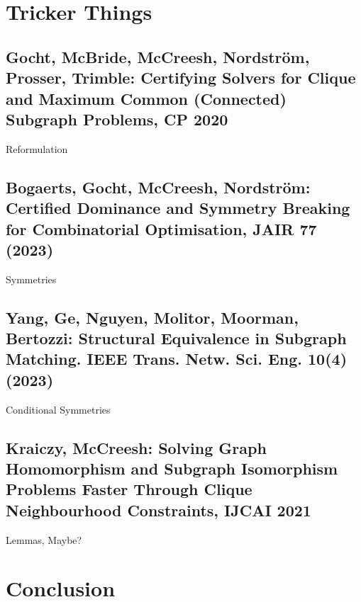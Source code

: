 \documentclass[aspectratio=169,compress,10pt]{beamer}
\begin{document}
\section{Tricker Things}

\subsection{Gocht, McBride, McCreesh, Nordstr\"om, Prosser, Trimble: Certifying Solvers for Clique and Maximum Common (Connected) Subgraph Problems, CP 2020}

\begin{frame}{Reformulation}
\end{frame}

\subsection{Bogaerts, Gocht, McCreesh, Nordstr\"om: Certified Dominance and Symmetry Breaking for
Combinatorial Optimisation, JAIR 77 (2023)}

\begin{frame}{Symmetries}
\end{frame}

\subsection{Yang, Ge, Nguyen, Molitor, Moorman, Bertozzi: Structural Equivalence in Subgraph Matching. IEEE Trans. Netw. Sci. Eng. 10(4) (2023)}

\begin{frame}{Conditional Symmetries}
\end{frame}

\subsection{Kraiczy, McCreesh: Solving Graph Homomorphism and Subgraph Isomorphism Problems Faster Through Clique Neighbourhood Constraints, IJCAI 2021}

\begin{frame}{Lemmas, Maybe?}
\end{frame}

\section{Conclusion}
\end{document}
